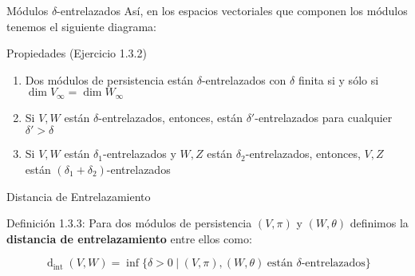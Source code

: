 \documentclass{beamer}
\newcounter{Ejercicio}
\def\dint{\operatorname{d}_{\operatorname{int}}}
\begin{document}
\begin{frame}{Módulos $\delta$-entrelazados}
Así, en los espacios vectoriales que componen los módulos tenemos el siguiente diagrama:

\begin{center}
\end{center}

\end{frame}


\begin{frame}{Propiedades (Ejercicio 1.3.2)}

\begin{enumerate}
  \item Dos módulos de persistencia están $\delta$-entrelazados con $\delta$ finita si y sólo si \(\operatorname{dim}V_\infty=\operatorname{dim}W_\infty\)
  \pause
  \item Si $V,W$ están $\delta$-entrelazados, entonces, están $\delta'$-entrelazados para cualquier $\delta'>\delta$
  \pause
  \item Si $V,W$ están $\delta_1$-entrelazados y $W,Z$ están $\delta_2$-entrelazados, entonces, $V,Z$ están $(\delta_1+\delta_2)$-entrelazados
\end{enumerate}

\end{frame}

\begin{frame}{Distancia de Entrelazamiento}

\begin{block}{Definición 1.3.3:}
Para dos módulos de persistencia \((V,\pi)\) y \((W,\theta)\) definimos la \textbf{distancia de entrelazamiento} entre ellos como: 

\[\dint(V,W)=\operatorname{inf} \{\delta > 0 \hspace{3pt}|\hspace{3pt} (V,\pi), (W,\theta)\hspace{3pt} \text{están $\delta$-entrelazados}\} \]
\end{block}

\end{frame}
\end{document}
